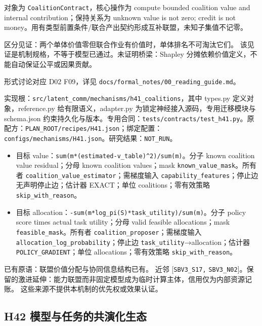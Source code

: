 \documentclass[
  10pt,
]{article}
\begin{document}
对象为 \nolinkurl{CoalitionContract}，核心操作为 compute bounded
coalition value and internal contribution；保持关系为 unknown value is
not zero; credit is not
money。用有类型前置条件/联合产出契约形成互补联盟，未知子集值不记零。

区分见证：两个单体价值零但联合作业有价值时，单体排名不可淘汰它们。
该见证是机制规格，不等于模型已通过。未证明桥梁：Shapley
分摊依赖价值定义，不能自动保证公平或因果贡献。

形式讨论对应 D02 F09，详见
{\small\nolinkurl{docs/formal_notes/00_reading_guide.md}}。

实现根：{\small\nolinkurl{src/latent_comm/mechanisms/h41_coalitions}}，其中
types.py 定义对象，reference.py 给有限语义，adapter.py
为锁定神经接入源码，专用迁移模块与 schema.json
约束持久化与版本。专用合同：{\small\nolinkurl{tests/contracts/test_h41.py}}。原配方：{\small\nolinkurl{PLAN_ROOT/recipes/H41.json}}；绑定配置：{\small\nolinkurl{configs/mechanisms/H41.json}}。研究结果：\nolinkurl{NOT_RUN}。

\begin{itemize}
\item
  目标
  value：{\small\nolinkurl{sum(m*(estimated-v_table)^2)/sum(m)}}。分子
  known coalition value residual；分母 known coalition values；mask
  \nolinkurl{known_value_mask}。所有者
  \nolinkurl{coalition_value_estimator}；需梯度输入
  \nolinkurl{capability_features}；停止边 无声明停止边；估计器
  EXACT；单位 coalitions；零有效策略 \nolinkurl{skip_with_reason}。
\item
  目标
  allocation：{\small\nolinkurl{-sum(m*log_pi(S)*task_utility)/sum(m)}}。分子
  policy score times actual task utility；分母 valid feasible
  allocations；mask \nolinkurl{feasible_mask}。所有者
  \nolinkurl{coalition_proposer}；需梯度输入
  \nolinkurl{allocation_log_probability}；停止边
  \nolinkurl{task_utility}→allocation；估计器
  \nolinkurl{POLICY_GRADIENT}；单位 allocations；零有效策略
  \nolinkurl{skip_with_reason}。
\end{itemize}

已有原语：联盟价值分配与协同信息结构已有。 近邻 {[}\nolinkurl{SBV3_S17,}
\nolinkurl{SBV3_N02}{]}。保留的激进延伸：能力联盟而非固定模型成为临时计算主体，信用仅为内部资源记账。
这些来源不提供本机制的优先权或效果认证。

\subsection{H42
模型与任务的共演化生态}\label{h42-ux6a21ux578bux4e0eux4efbux52a1ux7684ux5171ux6f14ux5316ux751fux6001}
\end{document}
